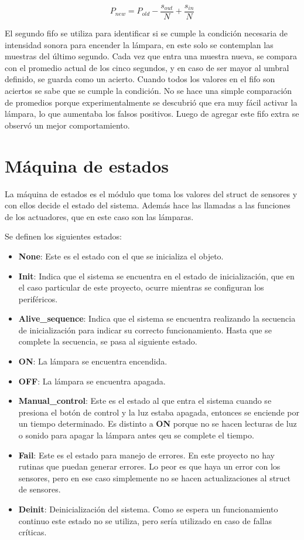 \begin{equation}
  P_{new} = P_{old}-\frac{s_{out}}{N}+\frac{s_{in}}{N}
\end{equation}

El segundo fifo se utiliza para identificar si se cumple la condición necesaria de intensidad sonora
para encender la lámpara, en este solo se contemplan las muestras del último segundo.  Cada vez que
entra una muestra nueva, se compara con el promedio actual de los cinco segundos, y en caso de ser
mayor al umbral definido, se guarda como un acierto. Cuando todos los valores en el fifo son
aciertos se sabe que se cumple la condición. No se hace una simple comparación de promedios porque
experimentalmente se descubrió que era muy fácil activar la lámpara, lo que aumentaba los falsos
positivos. Luego de agregar este fifo extra se observó un mejor comportamiento.

\section{Máquina de estados}

La máquina de estados es el módulo que toma los valores del struct de sensores y con ellos decide el
estado del sistema. Además hace las llamadas a las funciones de los actuadores, que en este caso son
las lámparas. 

Se definen los siguientes estados:

\begin{itemize}
\item \textbf{None}: Este es el estado con el que se inicializa el objeto. 
\item \textbf{Init}: Indica que el sistema se encuentra en el estado de inicialización, que en el
  caso particular de este proyecto, ocurre mientras se configuran los periféricos.
\item \textbf{Alive\_sequence}: Indica que el sistema se encuentra realizando la secuencia de
  inicialización para indicar su correcto funcionamiento. Hasta que se complete la secuencia, se
  pasa al siguiente estado. 
\item \textbf{ON}: La lámpara se encuentra encendida.
\item \textbf{OFF}: La lámpara se encuentra apagada.
\item \textbf{Manual\_control}: Este es el estado al que entra el sistema cuando se presiona el
  botón de control y la luz estaba apagada, entonces se enciende por un tiempo determinado. Es
  distinto a \textbf{ON} porque no se hacen lecturas de luz o sonido para apagar la lámpara antes
  qeu se complete el tiempo.
\item \textbf{Fail}: Este es el estado para manejo de errores. En este proyecto no hay rutinas que
  puedan generar errores. Lo peor es que haya un error con los sensores, pero en ese caso simplemente
  no se hacen actualizaciones al struct de sensores. 
\item \textbf{Deinit}: Deinicialización del sistema. Como se espera un funcionamiento continuo este
  estado no se utiliza, pero sería utilizado en caso de fallas críticas. 


  
\end{itemize}


